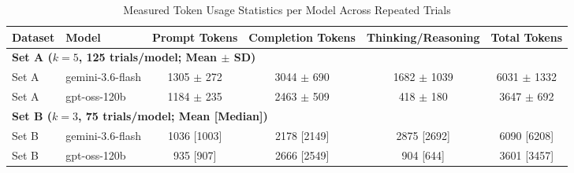 \begin{table}[htbp]
\centering
\caption{Measured Token Usage Statistics per Model Across Repeated Trials}
\label{tab:token_usage}
\begin{tabular}{llcccc}
\toprule
\textbf{Dataset} & \textbf{Model} & \textbf{Prompt Tokens} & \textbf{Completion Tokens} & \textbf{Thinking/Reasoning} & \textbf{Total Tokens} \\
\midrule
\multicolumn{6}{l}{\textbf{Set A ($k=5$, 125 trials/model; Mean $\pm$ SD)}} \\
\midrule
Set A & gemini-3.6-flash & 1305 $\pm$ 272 & 3044 $\pm$ 690 & 1682 $\pm$ 1039 & 6031 $\pm$ 1332 \\
Set A & gpt-oss-120b & 1184 $\pm$ 235 & 2463 $\pm$ 509 & 418 $\pm$ 180 & 3647 $\pm$ 692 \\
\midrule
\multicolumn{6}{l}{\textbf{Set B ($k=3$, 75 trials/model; Mean [Median])}} \\
\midrule
Set B & gemini-3.6-flash & 1036 [1003] & 2178 [2149] & 2875 [2692] & 6090 [6208] \\
Set B & gpt-oss-120b & 935 [907] & 2666 [2549] & 904 [644] & 3601 [3457] \\
\bottomrule
\end{tabular}
\end{table}
